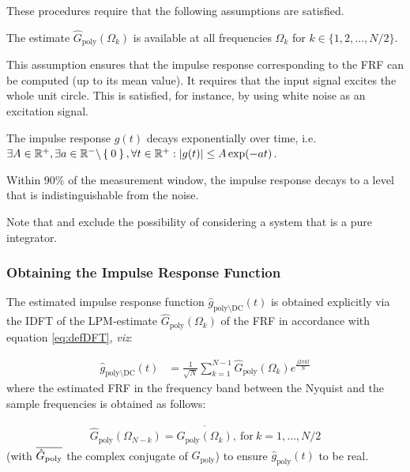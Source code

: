 These procedures require that the following assumptions are satisfied.

\begin{assumption}
The estimate $\hat G_\mathrm{poly}(\Omega_k)$ is available at all frequencies $\Omega_k$ for $k\in\{1,2,\dots,N/2\}$.
\end{assumption}

This assumption ensures that the impulse response corresponding to the \gls{FRF} can be computed (up to its mean value). It requires that the input signal excites the whole unit circle. This is satisfied, for instance, by using white noise as an excitation signal.


\begin{assumption}\label{ass:imprespdecay}
The impulse response $g(t)$ decays exponentially over time, i.e. $\exists A \in {\ensuremath{\mathbb{R}}}^{+}, \exists a \in {\ensuremath{\mathbb{R}}}^{-} \backslash \Set{0}, \forall t \in {\ensuremath{\mathbb{R}}}^{+}: \left| g(t) \right| \leq A \exp(- a t)$.
\end{assumption}

\begin{assumption}\label{ass:decay90perctime}
Within $90\%$ of the measurement window, the impulse response decays
 to a level that is indistinguishable from the noise.
\end{assumption}

Note that  and  exclude the possibility of considering a system that is a pure integrator.

\subsubsection{Obtaining the Impulse Response Function}

The estimated impulse response function  $\hat g_{\mathrm{poly}\setminus \mathrm{DC
}}(t)$ is obtained explicitly via the \gls{IDFT} of the \gls{LPM}-estimate $\hat G_\mathrm{poly}(\Omega_k)$ of the \gls{FRF} in accordance with equation \eqref{eq:defDFT}, \emph{viz}:

\begin{align}\label{eq:impRespiDFT}
\hat g_{\mathrm{poly}\setminus \mathrm{DC
}}(t) &= \frac{1}{\sqrt{N}}\sum_{k=1}^{N-1}\hat G_\mathrm{poly}(\Omega_k)e^{\frac{j2\pi kt}{N}}
\end{align}
where the estimated \gls{FRF} in the frequency band between  the Nyquist and the sample frequencies is obtained as follows:

\begin{align}
\hat G_\mathrm{poly}(\Omega_{N-k}) = \overline{\hat G_\mathrm{poly}(\Omega_k)},\ \text{for}\ k=1,\dots,N/2
\end{align}
(with $\overline{\hat G_\mathrm{poly}}$ the complex conjugate of $\hat G_\mathrm{poly}$) to ensure $\hat g_\mathrm{poly}(t)$ to be real.

